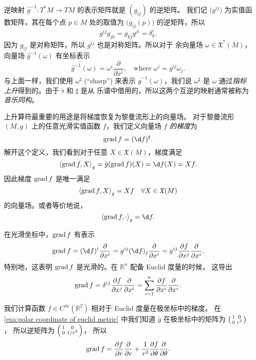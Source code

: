 逆映射 $\hat g^{-1}:T^*M\to TM$ 的表示矩阵就是 $(g_{ij})$ 的逆矩阵。
我们记 $\bigl(g^{ij}\bigr)$ 为实值函数矩阵，其在每个点 $p\in M$
处的取值为 $\bigl(g_{ij}(p)\bigr)$ 的逆矩阵，所以
\[
  g^{ij}g_{jk}=g_{kj}g^{ji}=\delta_k^i.  
\]
因为 $g_{ij}$ 是对称矩阵，所以 $g^{ij}$ 也是对称矩阵。所以对于
余向量场 $\omega\in \mathfrak{X}^*(M)$，向量场 $\hat g^{-1}(\omega)$
有坐标表示
\[
  \hat g^{-1}(\omega)=\omega^i\frac{\partial}{\partial x^i},
  \quad \text{where $\omega^i=g^{ij}\omega_j$}  .
\]
与上面一样，我们使用 $\omega^{\sharp}$ (``sharp'') 来表示
$\hat g^{-1}(\omega)$，我们说 $\omega^\sharp$ 是 $\omega$
通过\emph{指标上升}得到的。由于 $\flat$ 和 $\sharp$ 是从
乐谱中借用的，所以这两个互逆的映射通常被称为\emph{音乐同构}。

上升算符最重要的用途是将梯度恢复为黎曼流形上的向量场。
对于黎曼流形 $(M,g)$ 上的任意光滑实值函数 $f$，我们定义向量场
\emph{$f$ 的梯度}为
\[
  \grad f=(\d f)^\sharp.
\]
解开这个定义，我们看到对于任意 $X\in \mathfrak{X}(M)$，梯度满足
\[
  \inn{\grad f,X}_g=\hat g(\grad f)(X)=
  \d f(X)=Xf.
\]
因此梯度 $\operatorname{grad} f$ 是唯一满足
\[
  \left\langle \operatorname{grad} f,X\right\rangle_g=Xf\quad \forall X\in \mathfrak{X}(M)  
\]
的向量场。或者等价地说，
\[
  \inn{\grad f,\cdot}_g=\d f.  
\]

在光滑坐标中，$\operatorname{grad} f$ 有表示
\[
  \grad f=(\d f)^i\frac{\partial}{\partial x^i}
  =g^{ij}(\d f)_j  \frac{\partial}{\partial x^i}
  =g^{ij}\frac{\partial f}{\partial x^j}\frac{\partial}{\partial x^i}.
\]
特别地，这表明 $\operatorname{grad} f$ 是光滑的。在 $\mathbb{R}^n$ 配备 Euclid 度量的时候，
这导出
\[
  \operatorname{grad} f=\delta^{ij}\frac{\partial f}{\partial x^j}\frac{\partial}{\partial x^i}
  =\sum_{i=1}^n\frac{\partial f}{\partial x^i}\frac{\partial}{\partial x^i}.
\]

\begin{example}
  我们计算函数 $f\in C^\infty(\mathbb{R}^2)$ 相对于 Euclid 度量在极坐标中的梯度。
  在 \autoref{exa:polar coordinate of euclid metric} 中我们知道 $\bar g$
  在极坐标中的矩阵为 $\begin{psmallmatrix}1 & 0 \\ 0 & r^2\end{psmallmatrix}$，
  所以逆矩阵为 $\begin{psmallmatrix}1 & 0 \\ 0 & 1/r^2\end{psmallmatrix}$，
  所以 
  \[
    \operatorname{grad} f=\frac{\partial f}{\partial r}\frac{\partial}{\partial r}+
    \frac{1}{r^2}\frac{\partial f}{\partial\theta}  \frac{\partial}{\partial \theta}.
  \]
\end{example}


